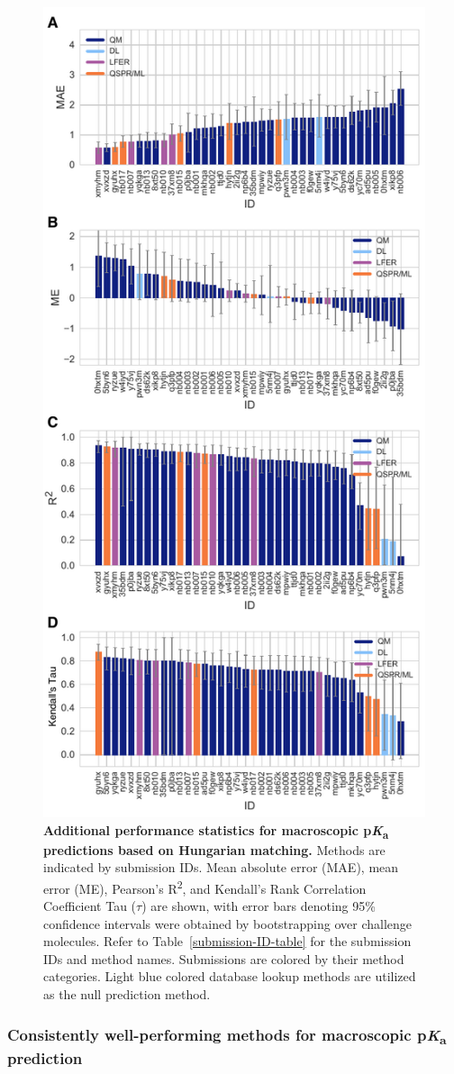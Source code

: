 \documentclass[9pt,lineno,final]{elife}
\newcommand{\pKa}{p\textit{K}\textsubscript{a}}
\begin{document}
\begin{figure}[ht!]
\centering
\includegraphics[width=0.5\linewidth]{figures/typeIII_statistics.pdf}
\caption{{\bf Additional performance statistics for macroscopic \pKa{} predictions based on Hungarian matching.} 
Methods are indicated by submission IDs. 
Mean absolute error (MAE), mean error (ME), Pearson’s R\textsuperscript{2}, and Kendall’s Rank Correlation Coefficient Tau ($\tau$) are shown, with error bars denoting 95\% confidence intervals were obtained by bootstrapping over challenge molecules. 
Refer to Table~\ref{submission-ID-table} for the submission IDs and method names. 
Submissions are colored by their method categories. 
Light blue colored database lookup methods are utilized as the null prediction method.
}
\label{fig:typeIII-statistics}
\end{figure}


\subsubsection{Consistently well-performing methods for macroscopic \pKa{} prediction}
\end{document}
